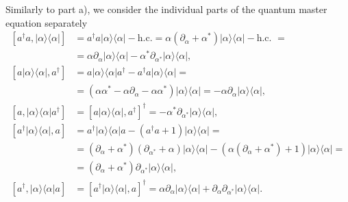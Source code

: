 \documentclass[english, parskip=full]{scrartcl}
\newcommand{\kla}{}
\newcommand{\klam}{}
\newcommand{\oper}{}
\newcommand{\tecxt}{}
\newcommand{\Bra}{}
\newcommand{\Ket}{}
\begin{document}
Similarly to part a), we consider the individual parts of the quantum master equation separately
\begin{align}
\klam\left[ a^\dagger a, \oper | \alpha \rangle\langle \alpha | \right] &= a^\dagger a\oper | \alpha \rangle\langle \alpha | - \tecxt\text{h.c.} = \alpha (\partial_\alpha + \alpha^\ast)\oper | \alpha \rangle\langle \alpha | - \tecxt\text{h.c. } = \\
&= \alpha\partial_\alpha \oper | \alpha \rangle\langle \alpha  | - \alpha^\ast \partial_{\alpha^\ast} \Ket | \alpha \rangle \Bra\langle \alpha | ,\\
\klam\left[ a\oper | \alpha \rangle\langle \alpha |, a^\dagger \right] &= a \oper | \alpha \rangle\langle \alpha |a^\dagger - a^\dagger a\oper | \alpha \rangle\langle \alpha |= \\
&= \kla\left( \alpha\alpha^\ast  - \alpha\partial_\alpha - \alpha\alpha^\ast \right) \oper | \alpha \rangle\langle \alpha | = -\alpha\partial_\alpha \oper | \alpha \rangle\langle \alpha |, \\
\klam\left[ a, \oper | \alpha \rangle\langle \alpha | a^\dagger  \right] &= \klam\left[ a\oper | \alpha \rangle\langle \alpha |, a^\dagger \right]^\dagger = -\alpha^\ast \partial_{\alpha^\ast} \oper | \alpha \rangle  \langle \alpha |,\\
\klam\left[ a^\dagger \oper | \alpha \rangle\langle \alpha |, a \right] &= a^\dagger \oper | \alpha \rangle\langle \alpha | a - \kla\left( a^\dagger a + 1 \right)\oper | \alpha \rangle\langle \alpha | = \\
&= (\partial_{\alpha} + \alpha^\ast) (\partial_{\alpha^\ast} + \alpha) \oper | \alpha \rangle  \langle \alpha |  - \kla\left( \alpha (\partial_\alpha + \alpha^\ast)  + 1 \right) \oper | \alpha \rangle\langle \alpha | = \\
&= \kla\left( \partial_\alpha +  \alpha^\ast \right) \partial_{\alpha^\ast}\oper | \alpha \rangle  \langle \alpha |,\\
\klam\left[ a^\dagger, \oper | \alpha \rangle\langle \alpha  |a \right] &= \klam\left[ a^\dagger\oper | \alpha \rangle\langle \alpha |, a \right]^\dagger = \alpha\partial_\alpha \oper | \alpha \rangle\langle \alpha | + \partial_\alpha \partial_{\alpha^\ast} \oper | \alpha \rangle \langle \alpha |.
\end{align}
\end{document}
